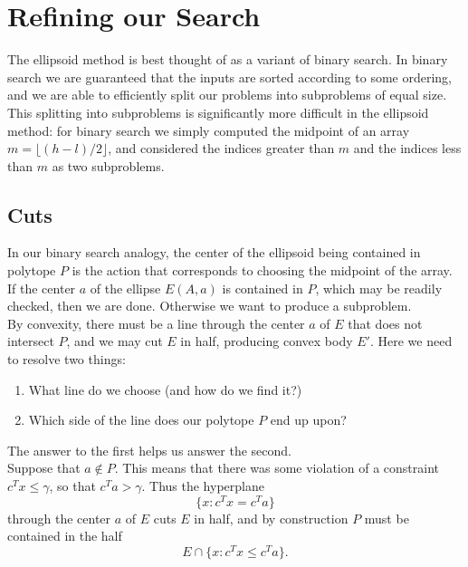 
\section{Refining our Search}
The ellipsoid method is best thought of as a variant of binary search.  In
binary search we are guaranteed that the inputs are sorted according to some
ordering, and we are able to efficiently split our problems into subproblems of
equal size. This splitting into subproblems is significantly more difficult in
the ellipsoid method: for binary search we simply computed the midpoint of an
array \(m = \lfloor (h - l) / 2 \rfloor\), and considered the indices greater
than \(m\) and the indices less than \(m\) as two subproblems.


\subsection{Cuts}
In our binary search analogy, the center of the ellipsoid being contained in
polytope \(P\) is the action that corresponds to choosing the midpoint of the
array. If the center \(a\) of the ellipse \(E(A,a)\) is contained in \(P\),
which may be readily checked, then we are done. Otherwise we want to produce a
subproblem.\\

By convexity, there must be a line through the center \(a\) of \(E\) that does
not intersect \(P\), and we may cut \(E\) in half, producing convex body \(E'\).
Here we need to resolve two things:
\begin{enumerate}
  \item What line do we choose (and how do we find it?)
  \item Which side of the line does our polytope \(P\) end up upon?
\end{enumerate}

The answer to the first helps us answer the second.\\

Suppose that \(a \not\in P\). This means that there was some violation of a
constraint \(c^Tx \leq \gamma\), so that \(c^Ta > \gamma\). Thus the hyperplane
\[\{x : c^T x = c^T a\}\]
through the center \(a\) of \(E\) cuts \(E\) in half, and by construction \(P\)
must be contained in the half
\begin{equation} \label{eq:ellipsoid-cut}
E \cap \{x : c^T x \leq c^T a\}.
\end{equation}

